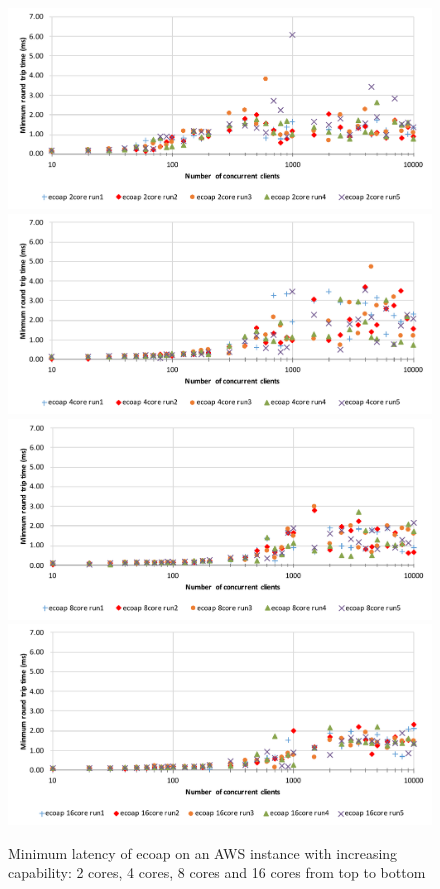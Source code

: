 \begin{figure}[!htbp]
\centering
\includegraphics[scale=0.6]{ecoap_min_latency_2cores}
\includegraphics[scale=0.6]{ecoap_min_latency_4cores}
\includegraphics[scale=0.6]{ecoap_min_latency_8cores}
\includegraphics[scale=0.6]{ecoap_min_latency_16cores}
\caption[Minimum latency of ecoap on an AWS instance with increasing capability]{Minimum latency of ecoap on an AWS instance with increasing capability: 2 cores, 4 cores, 8 cores and 16 cores from top to bottom}
\label{fig:ecoap_min_latency}
\end{figure}


